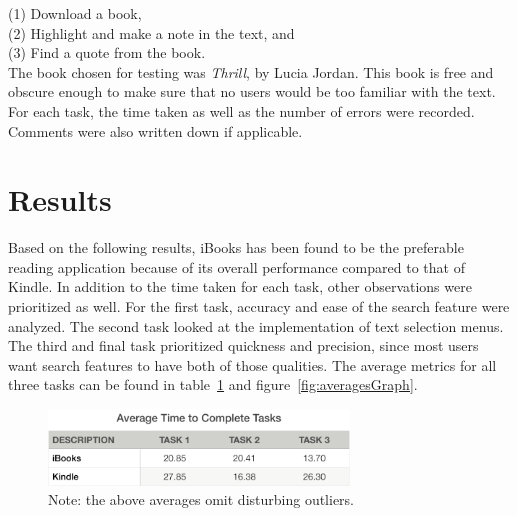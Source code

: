 \documentclass[journal, a4paper]{IEEEtran}
\begin{document}
    (1) Download a book, \\
    
    (2) Highlight and make a note in the text, and \\
    
    (3) Find a quote from the book. \\
    
    The book chosen for testing was \emph{Thrill}, by Lucia Jordan. This book is free and obscure enough to make sure that no users would be too familiar with the text. For each task, the time taken as well as the number of errors were recorded. Comments were also written down if applicable. 

\section{Results}
    Based on the following results, iBooks has been found to be the preferable reading application because of its overall performance compared to that of Kindle. In addition to the time taken for each task, other observations were prioritized as well. For the first task, accuracy and ease of the search feature were analyzed. The second task looked at the implementation of text selection menus. The third and final task prioritized quickness and precision, since most users want search features to have both of those qualities. The average metrics for all three tasks can be found in table~\ref{fig:averagesTable} and figure~\ref{fig:averagesGraph}.
    
    \begin{figure}[!hbt]
		\begin{center}
		\includegraphics[width=8cm]{averagesTable}
		\caption{Note: the above averages omit disturbing outliers.}
		\label{fig:averagesTable}
		\end{center}
	\end{figure}
    
\end{document}
